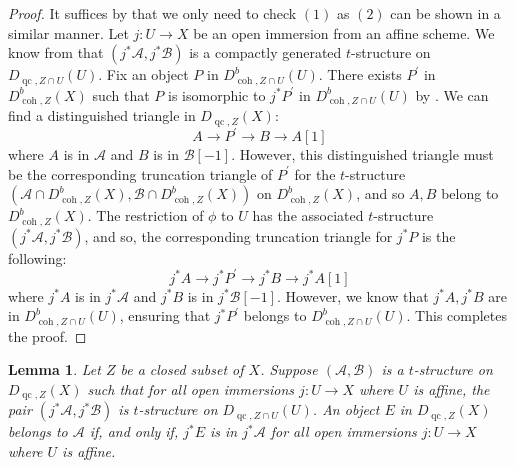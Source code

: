 \documentclass[11pt]{amsart}
\theoremstyle{plain}
\newtheorem{lemma}[theorem]{Lemma}
\theoremstyle{definition}
\numberwithin{equation}{section}
\numberwithin{theorem}{section}
\begin{document}
\begin{proof}
    It suffices by  that we only need to check $(1)$ as $(2)$ can be shown in a similar manner. Let $j \colon U \to X$ be an open immersion from an affine scheme. We know from  that $(j^\ast \mathcal{A}, j^\ast \mathcal{B})$ is a compactly generated $t$-structure on $D_{\operatorname{qc},Z\cap U}(U)$. Fix an object $P$ in $D^b_{\operatorname{coh},Z\cap U}(U)$. There exists $P^\prime$ in $D^b_{\operatorname{coh},Z}(X)$ such that $P$ is isomorphic to $j^\ast P^\prime$ in $D^b_{\operatorname{coh},Z\cap U} (U)$ by . We can find a distinguished triangle in $D_{\operatorname{qc},Z}(X)$:
    \begin{displaymath}
        A \to P^\prime \to B \to A[1]
    \end{displaymath}
    where $A$ is in $\mathcal{A}$ and $B$ is in $\mathcal{B}[-1]$. However, this distinguished triangle must be the corresponding truncation triangle of $P^\prime$ for the $t$-structure $(\mathcal{A}\cap D^b_{\operatorname{coh},Z} (X), \mathcal{B}\cap D^b_{\operatorname{coh},Z} (X))$ on $D^b_{\operatorname{coh},Z}(X)$, and so $A,B$ belong to $D^b_{\operatorname{coh},Z}(X)$. The restriction of $\phi$ to $U$ has the associated $t$-structure $(j^\ast \mathcal{A},j^\ast \mathcal{B})$, and so, the corresponding truncation triangle for $j^\ast P$ is the following:
    \begin{displaymath}
        j^\ast A \to j^\ast P^\prime \to j^\ast B \to j^\ast A[1]
    \end{displaymath}
    where $j^\ast A$ is in $j^\ast \mathcal{A}$ and $j^\ast B$ is in $j^\ast \mathcal{B}[-1]$. However, we know that $j^\ast A, j^\ast B$ are in $D^b_{\operatorname{coh}, Z\cap U}(U)$, ensuring that $j^\ast P^\prime$ belongs to $D^b_{\operatorname{coh}, Z\cap U}(U)$. This completes the proof.
\end{proof}

\begin{lemma}\label{lem:local_to_global_aisle}
    Let $Z$ be a closed subset of $X$. Suppose $(\mathcal{A},\mathcal{B})$ is a $t$-structure on $D_{\operatorname{qc},Z}(X)$ such that for all open immersions $j \colon U \to X$ where $U$ is affine, the pair $(j^\ast \mathcal{A}, j^\ast \mathcal{B})$ is $t$-structure on $D_{\operatorname{qc},Z\cap U}(U)$. An object $E$ in $D_{\operatorname{qc},Z}(X)$ belongs to $\mathcal{A}$ if, and only if, $j^\ast E$ is in $j^\ast \mathcal{A}$ for all open immersions $j \colon U \to X$ where $U$ is affine.
\end{lemma}
\end{document}
